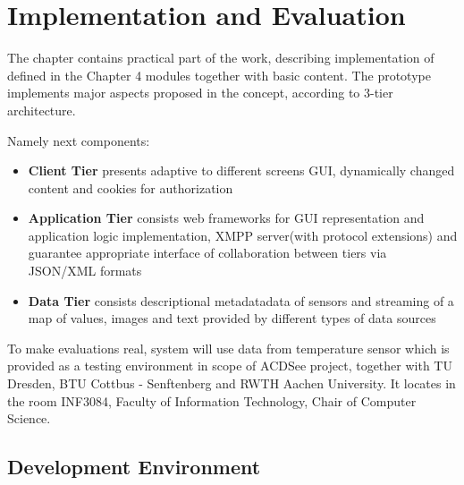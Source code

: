 \chapter{Implementation and Evaluation}
	The chapter contains practical part of the work, describing implementation of defined in the Chapter 4 modules together with basic content. The prototype implements major aspects proposed in the concept, according to 3-tier architecture. 

	Namely next components:
	 \begin{itemize}
		\item \textbf{Client Tier} presents adaptive to different screens GUI, dynamically changed content and cookies for authorization
		\item \textbf{Application Tier} consists web frameworks for GUI representation and application logic implementation, XMPP server(with protocol extensions) and guarantee appropriate interface of collaboration between tiers via JSON/XML formats
		\item \textbf{Data Tier} consists descriptional metadatadata of sensors and streaming of a map of values, images and text provided by different types of data sources
	\end{itemize}
	To make evaluations real, system will use data from temperature sensor which is provided as a testing environment in scope of ACDSee project, together with TU Dresden, BTU Cottbus - Senftenberg and RWTH Aachen University. It locates in the room INF3084, Faculty of Information Technology, Chair of Computer Science.


\section{Development Environment}
